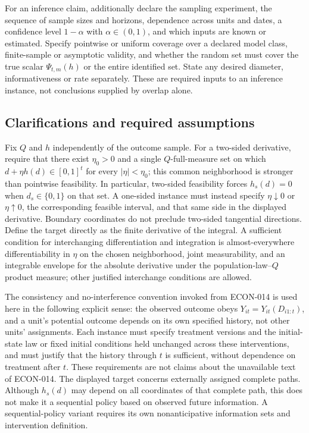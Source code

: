 \documentclass[11pt,a4paper]{article}
\begin{document}
For an inference claim, additionally declare the sampling experiment, the sequence of sample sizes and horizons, dependence across units and dates, a confidence level $1-\alpha$ with $\alpha\in(0,1)$, and which inputs are known or estimated. Specify pointwise or uniform coverage over a declared model class, finite-sample or asymptotic validity, and whether the random set must cover the true scalar $\Psi_{t,m}(h)$ or the entire identified set. State any desired diameter, informativeness or rate separately. These are required inputs to an inference instance, not conclusions supplied by overlap alone.

\subsection*{Clarifications and required assumptions}

Fix $Q$ and $h$ independently of the outcome sample. For a two-sided derivative, require that there exist $\eta_0>0$ and a single $Q$-full-measure set on which $d+\eta h(d)\in[0,1]^t$ for every $|\eta|<\eta_0$; this common neighborhood is stronger than pointwise feasibility. In particular, two-sided feasibility forces $h_s(d)=0$ when $d_s\in\{0,1\}$ on that set. A one-sided instance must instead specify $\eta\downarrow0$ or $\eta\uparrow0$, the corresponding feasible interval, and that same side in the displayed derivative. Boundary coordinates do not preclude two-sided tangential directions. Define the target directly as the finite derivative of the integral. A sufficient condition for interchanging differentiation and integration is almost-everywhere differentiability in $\eta$ on the chosen neighborhood, joint measurability, and an integrable envelope for the absolute derivative under the population-law--$Q$ product measure; other justified interchange conditions are allowed.

The consistency and no-interference convention invoked from ECON-014 is used here in the following explicit sense: the observed outcome obeys $Y_{it}=Y_{it}(D_{i1:t})$, and a unit's potential outcome depends on its own specified history, not other units' assignments. Each instance must specify treatment versions and the initial-state law or fixed initial conditions held unchanged across these interventions, and must justify that the history through $t$ is sufficient, without dependence on treatment after $t$. These requirements are not claims about the unavailable text of ECON-014. The displayed target concerns externally assigned complete paths. Although $h_s(d)$ may depend on all coordinates of that complete path, this does not make it a sequential policy based on observed future information. A sequential-policy variant requires its own nonanticipative information sets and intervention definition.
\end{document}
